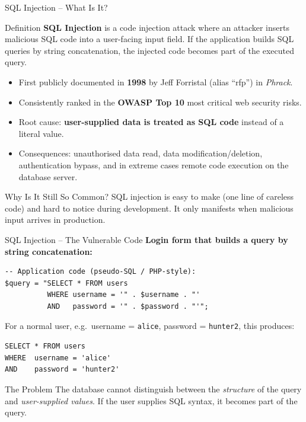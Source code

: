 \begin{frame}{SQL Injection -- What Is It?}
  \begin{block}{Definition}
    \textbf{SQL Injection} is a code injection attack where an attacker inserts malicious SQL code
    into a user-facing input field. If the application builds SQL queries by string concatenation,
    the injected code becomes part of the executed query.
  \end{block}

  \begin{itemize}
    \item First publicly documented in \textbf{1998} by Jeff Forristal (alias ``rfp'') in \emph{Phrack}.
    \item Consistently ranked in the \textbf{OWASP Top 10} most critical web security risks.
    \item Root cause: \textbf{user-supplied data is treated as SQL code} instead of a literal value.
    \item Consequences: unauthorised data read, data modification/deletion, authentication bypass,
          and in extreme cases remote code execution on the database server.
  \end{itemize}

  \begin{exampleblock}{Why Is It Still So Common?}
    SQL injection is easy to make (one line of careless code) and hard to notice during development.
    It only manifests when malicious input arrives in production.
  \end{exampleblock}
\end{frame}

\begin{frame}[fragile]{SQL Injection -- The Vulnerable Code}
  \textbf{Login form that builds a query by string concatenation:}

  \begin{lstlisting}[style=sqlstyle]
-- Application code (pseudo-SQL / PHP-style):
$query = "SELECT * FROM users
          WHERE username = '" . $username . "'
          AND   password = '" . $password . "'";
  \end{lstlisting}

  \medskip
  For a normal user, e.g.\ username = \texttt{alice}, password = \texttt{hunter2}, this produces:

  \begin{lstlisting}[style=sqlstyle]
SELECT * FROM users
WHERE  username = 'alice'
AND    password = 'hunter2'
  \end{lstlisting}

  \begin{alertblock}{The Problem}
    The database cannot distinguish between the \emph{structure} of the query and
    \emph{user-supplied values}. If the user supplies SQL syntax, it becomes part of the query.
  \end{alertblock}
\end{frame}


